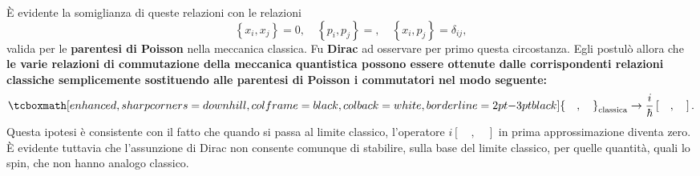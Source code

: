È evidente la somiglianza di queste relazioni con le relazioni
	\begin{equation}
		\left\{ x_i, x_j\right\}=0,\quad \left\{ p_i, p_j\right\}=, \quad \left\{ x_i, p_j\right\}=\delta _{ij}, 
\end{equation}
valida per le \textbf{parentesi di Poisson} nella meccanica classica. Fu \textbf{Dirac} ad osservare per primo questa circostanza. Egli postulò allora che \textbf{le varie relazioni di commutazione della meccanica quantistica possono essere ottenute dalle corrispondenti relazioni classiche semplicemente sostituendo alle parentesi di Poisson i commutatori nel modo seguente:}
	\begin{equation}
		\tcboxmath[enhanced, sharp corners=downhill, colframe=black, colback=white, borderline={2pt}{-3pt}{black}]{
			\left\{ \quad, \quad \right\} _{\textrm{classica}} \rightarrow \frac{i}{\hbar}\left[ \quad, \quad \right] .
			}
	\end{equation}
Questa ipotesi è consistente con il fatto che quando si passa al limite classico, l'operatore $i\left[ \quad, \quad \right]$ in prima approssimazione diventa zero.\\

È evidente tuttavia che l'assunzione di Dirac non consente comunque di stabilire, sulla base del limite classico, per quelle quantità, quali lo spin, che non hanno analogo classico.
